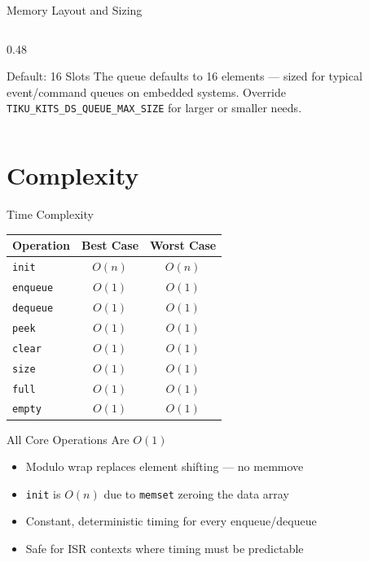 \documentclass[aspectratio=169, 10pt]{beamer}
\begin{document}
\begin{frame}{Memory Layout and Sizing}
\begin{columns}[T]
\begin{column}{0.48\textwidth}
\vspace{0.3em}
\begin{alertblock}{Default: 16 Slots}
The queue defaults to 16 elements --- sized for typical
event/command queues on embedded systems. Override
\texttt{TIKU\_KITS\_DS\_QUEUE\_MAX\_SIZE} for larger or smaller needs.
\end{alertblock}
\end{column}
\end{columns}
\end{frame}

\section{Complexity}

\begin{frame}{Time Complexity}
\begin{table}
\centering
\begin{tabular}{@{}lcc@{}}
\toprule
\textbf{Operation} & \textbf{Best Case} & \textbf{Worst Case} \\
\midrule
\texttt{init}     & $O(n)$ & $O(n)$ \\
\texttt{enqueue}  & $O(1)$ & $O(1)$ \\
\texttt{dequeue}  & $O(1)$ & $O(1)$ \\
\texttt{peek}     & $O(1)$ & $O(1)$ \\
\texttt{clear}    & $O(1)$ & $O(1)$ \\
\texttt{size}     & $O(1)$ & $O(1)$ \\
\texttt{full}     & $O(1)$ & $O(1)$ \\
\texttt{empty}    & $O(1)$ & $O(1)$ \\
\bottomrule
\end{tabular}
\end{table}

\vspace{0.5em}
\begin{block}{All Core Operations Are $O(1)$}
\begin{itemize}
  \item Modulo wrap replaces element shifting --- no memmove
  \item \texttt{init} is $O(n)$ due to \texttt{memset} zeroing the data array
  \item Constant, deterministic timing for every enqueue/dequeue
  \item Safe for ISR contexts where timing must be predictable
\end{itemize}
\end{block}
\end{frame}
\end{document}
